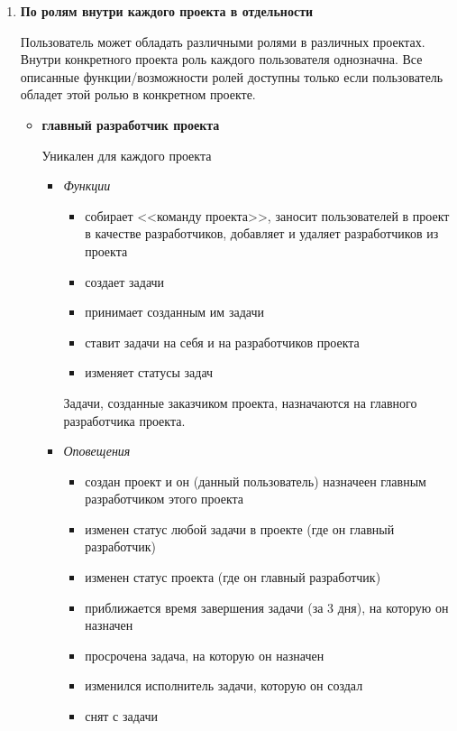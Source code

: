 \documentclass[14pt,a4paper]{extarticle}
\begin{document}
\begin{enumerate}
		\item {\bf По ролям внутри каждого проекта в отдельности}
		\par Пользователь может обладать различными ролями в различных проектах. Внутри конкретного проекта роль каждого пользователя однозначна. Все описанные функции/возможности ролей доступны только если пользователь обладет этой ролью в конкретном проекте.
		\begin{itemize}
			\item {\bf главный разработчик проекта}
			\par Уникален для каждого проекта
			\begin{itemize}
				\item {\it Функции}
				\begin{itemize}
					\item собирает <<команду проекта>>, заносит пользователей в проект в качестве разработчиков, добавляет и удаляет разработчиков из проекта
					\item создает задачи
					\item принимает созданным им задачи
					\item ставит задачи на себя и на разработчиков проекта
					\item изменяет статусы задач
				\end{itemize}
				Задачи, созданные заказчиком проекта, назначаются на главного разработчика проекта.
				
				\item {\it Оповещения}
				\begin{itemize}
					\item создан проект и он (данный пользователь) назначеен главным разработчиком этого проекта
					
					\item изменен статус любой задачи в проекте (где он главный разработчик)
					
					\item изменен статус проекта (где он главный разработчик)
					
					\item приближается время завершения задачи (за 3 дня), на которую он назначен
					
					\item просрочена задача, на которую он назначен
					
					\item изменился исполнитель задачи, которую он создал
					
					\item снят с задачи
				\end{itemize}
			\end{itemize}
			

\end{itemize}
\end{enumerate}
\end{document}
